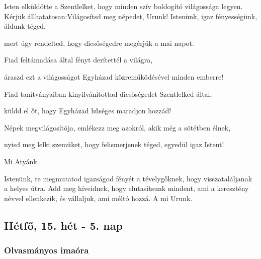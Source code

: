 \documentclass[twoside]{article}
\begin{document}





\begin{preces}{Isten elküldötte a Szentlelket, hogy minden szív boldogító világossága legyen. Kérjük állhatatosan:}{Világosítsd meg népedet, Urunk!}
  Istenünk, igaz fényességünk, áldunk téged,

  \reddash mert úgy rendelted, hogy dicsőségedre megérjük a mai napot.

  Fiad feltámadása által fényt derítettél a világra,

  \reddash áraszd ezt a világosságot Egyházad közreműködésével minden emberre!

  Fiad tanítványaiban kinyilvánítottad dicsőségedet Szentlelked által,

  \reddash küldd el őt, hogy Egyházad hűséges maradjon hozzád!

  Népek megvilágosítója, emlékezz meg azokról, akik még a sötétben élnek,

  \reddash nyisd meg lelki szemüket, hogy felismerjenek téged, egyedül igaz Istent!
\end{preces}
Mi Atyánk...

\label{DXV/L/Coll}

Istenünk, te megmutatod igazságod fényét a tévelygőknek, hogy visszataláljanak a helyes útra. Add meg híveidnek, hogy elutasítsunk mindent, ami a keresztény névvel ellenkezik, és vállaljuk, ami méltó hozzá. A mi Urunk.


\subsection*{Hétfő, 15. hét - 5. nap}


\subsubsection*{Olvasmányos imaóra}

\end{document}

